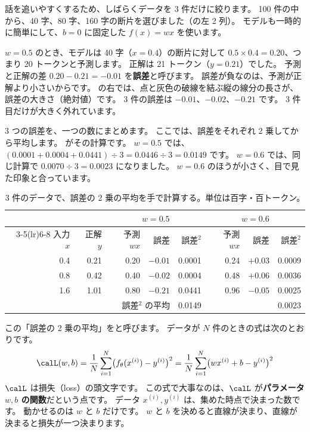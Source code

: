 話を追いやすくするため、しばらくデータを 3 件だけに絞ります。
100 件の中から、40 字、80 字、160 字の断片を選びました（の左 2 列）。
モデルも一時的に簡単にして、$b=0$ に固定した $f(x)=wx$ を使います。

$w=0.5$ のとき、モデルは 40 字（$x=0.4$）の断片に対して $0.5\times 0.4=0.20$、つまり 20 トークンと予測します。
正解は 21 トークン（$y=0.21$）でした。
予測と正解の差 $0.20-0.21=-0.01$ を\textbf{誤差}と呼びます。
誤差が負なのは、予測が正解より小さいからです。
の右では、点と灰色の破線を結ぶ縦の線分の長さが、誤差の大きさ（絶対値）です。
3 件の誤差は $-0.01$、$-0.02$、$-0.21$ です。
3 件目だけが大きく外れています。

3 つの誤差を、一つの数にまとめます。
ここでは、誤差をそれぞれ 2 乗してから平均します。
がその計算です。
$w=0.5$ では、$(0.0001+0.0004+0.0441)\div 3 = 0.0446\div 3 = 0.0149$ です。
$w=0.6$ では、同じ計算で $0.0070\div 3 = 0.0023$ になりました。
$w=0.6$ のほうが小さく、目で見た印象と合っています。

\begin{table}[tbp]
\centering
\caption{3 件のデータで、誤差の 2 乗の平均を手で計算する。単位は百字・百トークン。}
\label{tab:ml-hand-loss}
\small
\begin{tabular}{rrrrrrrr}
\toprule
 & & \multicolumn{3}{c}{$w=0.5$} & \multicolumn{3}{c}{$w=0.6$} \\
\cmidrule(lr){3-5}\cmidrule(lr){6-8}
入力 $x$ & 正解 $y$ & 予測 $wx$ & 誤差 & 誤差$^2$ & 予測 $wx$ & 誤差 & 誤差$^2$ \\
\midrule
0.4 & 0.21 & 0.20 & $-0.01$ & 0.0001 & 0.24 & $+0.03$ & 0.0009 \\
0.8 & 0.42 & 0.40 & $-0.02$ & 0.0004 & 0.48 & $+0.06$ & 0.0036 \\
1.6 & 1.01 & 0.80 & $-0.21$ & 0.0441 & 0.96 & $-0.05$ & 0.0025 \\
\midrule
\multicolumn{4}{r}{誤差$^2$ の平均} & 0.0149 & & & 0.0023 \\
\bottomrule
\end{tabular}
\end{table}

この「誤差の 2 乗の平均」をと呼びます。
データが $N$ 件のときの式は次のとおりです。
\begin{equation}
\calL(w, b) = \frac{1}{N}\sum_{i=1}^{N}\bigl(f_\theta(x^{(i)}) - y^{(i)}\bigr)^2
            = \frac{1}{N}\sum_{i=1}^{N}\bigl(wx^{(i)} + b - y^{(i)}\bigr)^2
\label{eq:ml-mse}
\end{equation}
$\calL$ は損失（loss）の頭文字です。
この式で大事なのは、$\calL$ が\textbf{パラメータ $w, b$ の関数}だという点です。
データ $x^{(i)}, y^{(i)}$ は、集めた時点で決まった数です。
動かせるのは $w$ と $b$ だけです。
$w$ と $b$ を決めると直線が決まり、直線が決まると損失が一つ決まります。

